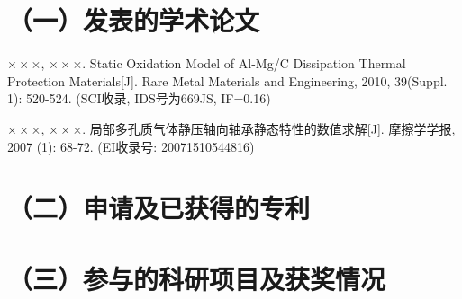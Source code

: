 \publication

\section*{（一）发表的学术论文}
\begin{listSquare}
  \item {\Large$\times \times \times$, $\times \times \times$}. 
    Static Oxidation Model of Al-Mg/C Dissipation Thermal Protection 
    Materials[J]. Rare Metal Materials and Engineering,
    2010, 39(Suppl. 1): 520-524. (SCI收录, IDS号为669JS, IF=0.16)
  \item {\Large$\times \times \times$, $\times \times \times$}. 
    局部多孔质气体静压轴向轴承静态特性的数值求解[J].
    摩擦学学报, 2007 (1): 68-72. (EI收录号: 20071510544816)
\end{listSquare}

\section*{（二）申请及已获得的专利}

\section*{（三）参与的科研项目及获奖情况}


